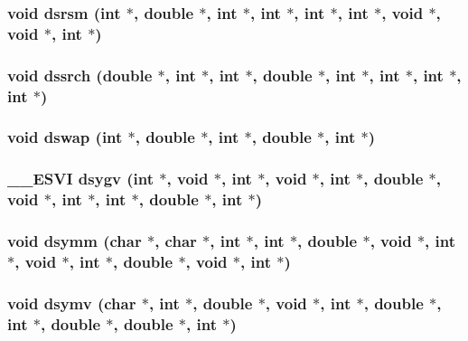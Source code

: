 \subsubsection{\setlength{\rightskip}{0pt plus 5cm}void dsrsm (int $\ast$, double $\ast$, int $\ast$, int $\ast$, int $\ast$, int $\ast$, void $\ast$, void $\ast$, int $\ast$)}\label{essl_8h_7d03b0ac3dc3a238aa45163bdc40408a}


\subsubsection{\setlength{\rightskip}{0pt plus 5cm}void dssrch (double $\ast$, int $\ast$, int $\ast$, double $\ast$, int $\ast$, int $\ast$, int $\ast$, int $\ast$)}\label{essl_8h_1692077034471e3bbea772cf62e5f6b9}


\subsubsection{\setlength{\rightskip}{0pt plus 5cm}void dswap (int $\ast$, double $\ast$, int $\ast$, double $\ast$, int $\ast$)}\label{essl_8h_eab7b67e0d5b59a661febf3ac167c2cd}


\subsubsection{\setlength{\rightskip}{0pt plus 5cm}\_\-\_\-ESVI dsygv (int $\ast$, void $\ast$, int $\ast$, void $\ast$, int $\ast$, double $\ast$, void $\ast$, int $\ast$, int $\ast$, double $\ast$, int $\ast$)}\label{essl_8h_c484ed141fe4fe27d75c25bf1b480baa}


\subsubsection{\setlength{\rightskip}{0pt plus 5cm}void dsymm (char $\ast$, char $\ast$, int $\ast$, int $\ast$, double $\ast$, void $\ast$, int $\ast$, void $\ast$, int $\ast$, double $\ast$, void $\ast$, int $\ast$)}\label{essl_8h_72762959281fcc6c5632defaa6829e0f}


\subsubsection{\setlength{\rightskip}{0pt plus 5cm}void dsymv (char $\ast$, int $\ast$, double $\ast$, void $\ast$, int $\ast$, double $\ast$, int $\ast$, double $\ast$, double $\ast$, int $\ast$)}\label{essl_8h_65be2d49a39937b57a9bfbee4052c260}


